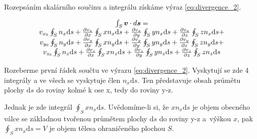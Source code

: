Rozepsáním skalárního součinu a integrálu získáme výraz \eqref{eq:divergence_2}.

\begin{equation}
\label{eq:divergence_2}
\begin{matrix}
\int_S \boldsymbol{v} \cdot d\boldsymbol{s} = \\
v_{x_0} \oint_S n_x \mathrm{d}s + \frac{\partial v_x}{\partial x} \oint_S x n_x \mathrm{d}s + \frac{\partial v_x}{\partial y} \oint_S y n_x \mathrm{d}s + \frac{\partial v_x}{\partial z} \oint_S z n_x \mathrm{d}s + \\
v_{y_0} \oint_S n_y \mathrm{d}s + \frac{\partial v_y}{\partial x} \oint_S x n_y \mathrm{d}s + \frac{\partial v_y}{\partial y} \oint_S y n_y \mathrm{d}s + \frac{\partial v_y}{\partial z} \oint_S z n_y \mathrm{d}s + \\
v_{z_0} \oint_S n_z \mathrm{d}s + \frac{\partial v_z}{\partial x} \oint_S x n_z \mathrm{d}s + \frac{\partial v_z}{\partial y} \oint_S y n_z \mathrm{d}s + \frac{\partial v_z}{\partial z} \oint_S z n_z \mathrm{d}s
\end{matrix}
\end{equation}

Rozeberme první řádek součtu ve výrazu \eqref{eq:divergence_2}. Vyskytují se zde 4 integrály a ve všech se vyskytuje člen \(n_x \mathrm{d}s\). Ten představuje obsah průmětu plochy \(\mathrm{d}s\) do roviny kolmé k ose x, tedy do roviny y-z.

Jednak je zde integrál \(\oint_S x n_x \mathrm{d}s\). Uvědomíme-li si, že \(x n_x \mathrm{d}s\) je objem obecného válce se základnou tvořenou průmětem plochy \(\mathrm{d}s\) do roviny y-z a~výškou \(x\), pak \(\oint_S x n_x \mathrm{d}s = V\) je objem tělesa ohraničeného plochou \(S\).


